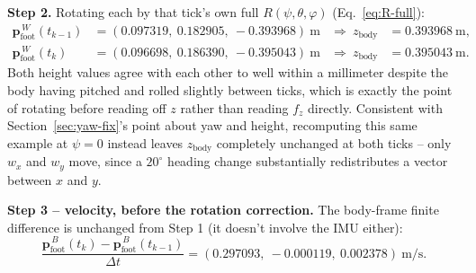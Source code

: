 \documentclass[11pt]{article}
\begin{document}
\noindent \textbf{Step 2.} Rotating each by that tick's own full
$R(\psi,\theta,\varphi)$ (Eq.~\eqref{eq:R-full}):
\begin{align}
\mathbf{p}_{\text{foot}}^{\,W}(t_{k-1}) &= (0.097319,\ 0.182905,\ -0.393968)\ \text{m}
&\Rightarrow\ z_{\text{body}} &= 0.393968\ \text{m}, \\
\mathbf{p}_{\text{foot}}^{\,W}(t_{k})   &= (0.096698,\ 0.186390,\ -0.395043)\ \text{m}
&\Rightarrow\ z_{\text{body}} &= 0.395043\ \text{m}.
\end{align}
Both height values agree with each other to well within a millimeter
despite the body having pitched and rolled slightly between ticks, which is
exactly the point of rotating before reading off $z$ rather than reading
$f_z$ directly. Consistent with Section~\ref{sec:yaw-fix}'s point about
yaw and height, recomputing this same example at $\psi = 0$ instead leaves
$z_{\text{body}}$ completely unchanged at both ticks -- only $w_x$ and
$w_y$ move, since a $20^\circ$ heading change substantially redistributes a
vector between $x$ and $y$.

\noindent \textbf{Step 3 -- velocity, before the rotation correction.} The
body-frame finite difference is unchanged from Step 1 (it doesn't involve
the IMU either):
\begin{equation}
\frac{\mathbf{p}_{\text{foot}}^{\,B}(t_k) - \mathbf{p}_{\text{foot}}^{\,B}(t_{k-1})}{\Delta t}
= (0.297093,\ -0.000119,\ 0.002378)\ \text{m/s}.
\end{equation}
\end{document}
